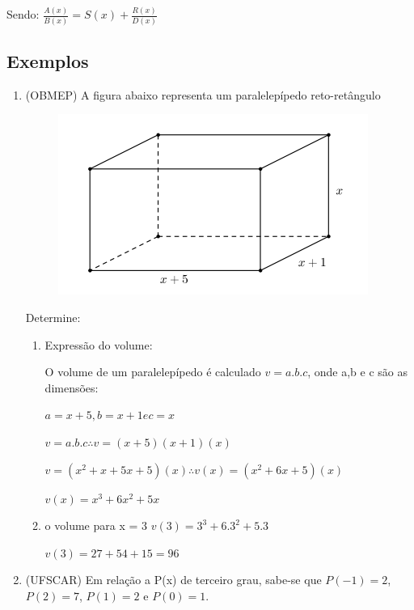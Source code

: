 \begin{multicols*}{2}
             Sendo:
             $\frac{A(x)}{B(x)} = S(x) +\frac{R(x)}{D(x)}$
             
            \subsection*{Exemplos}
            \begin{enumerate}
            \item (OBMEP) A figura abaixo representa um paralelepípedo reto-retângulo
            
            
             \begin{figure}[H]
                \includegraphics[scale=0.5]{assets/rafael/img24.png}
            \end{figure}
             Determine:
                 \begin{enumerate}
                    \item Expressão do volume:
                    
                        O volume de um paralelepípedo é calculado $v = a.b.c$, onde a,b e c são as 								dimensões: 
                        
                        $a = x+5, b = x+1 e c = x$
                        
                        $v = a.b.c \therefore v = (x+5)(x+1)(x)$
                        
                        $v = (x^2 + x + 5x +5)(x) \therefore v(x) = (x^2 +6x +5)(x)$
                        
                        $v(x) = x^3 + 6x^2 + 5x$
                    \item o volume para x = 3
                        $v(3) = 3^3 + 6.3^2 + 5.3$
                        
                        $v(3) = 27 + 54 + 15 = 96$
                \end{enumerate}
            \item (UFSCAR) Em relação a P(x) de terceiro grau, sabe-se que $P(-1) = 2$, $P(2) = 7$, 
            $P(1) = 2$ e	$P(0) = 1$.
            

\end{enumerate}
\end{multicols*}
